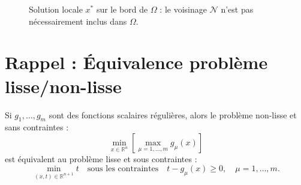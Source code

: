 \begin{figure}[H]
\centering
{}
\caption{Solution locale $x^*$ sur le bord de $\Omega$ : le voisinage $\mathcal{N}$ n'est pas nécessairement inclus dans $\Omega$.}
\label{fig:local-solution-feasible}
\end{figure}

\section{Rappel : Équivalence problème lisse/non-lisse}

\begin{remarque}
Si $g_1, \dots, g_m$ sont des fonctions scalaires régulières, alors le problème non-lisse et sans contraintes :
\begin{equation}
    \min_{x \in \mathbb{R}^n} \left[ \max_{\mu = 1, \dots, m} g_\mu(x) \right]
\end{equation}
est équivalent au problème lisse et sous contraintes :
\begin{equation}
    \min_{(x, t) \in \mathbb{R}^{n+1}} t \quad \text{sous les contraintes} \quad t - g_\mu(x) \geq 0, \quad \mu = 1, \dots, m.
\end{equation}
\end{remarque}

